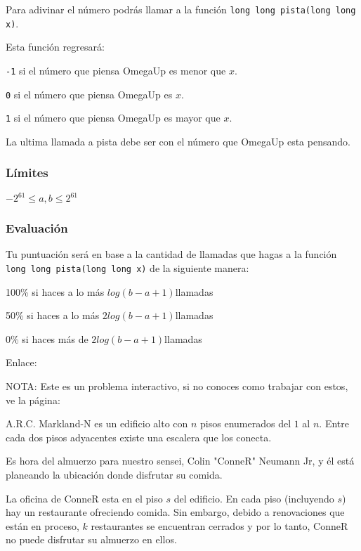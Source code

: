 Para adivinar el número podrás llamar a la función \verb|long long pista(long long x)|.

Esta función regresará:
\begin{plimits}
	\item \verb|-1| si el número que piensa OmegaUp es menor que \(x\).
	\item \verb|0| si el número que piensa OmegaUp es \(x\).
	\item \verb|1| si el número que piensa OmegaUp es mayor que \(x\).
\end{plimits} 

La ultima llamada a pista debe ser con el número que OmegaUp esta pensando.

\subsubsection*{Límites}
\begin{plimits}
	\item \(-2^{61}\leq a,b \leq 2^{61}\)	
\end{plimits}
\subsubsection*{Evaluación}
Tu puntuación será en base a la cantidad de llamadas que hagas a la función \verb|long long pista(long long x)| de la siguiente manera:
\begin{plimits}
	\item 100\% si haces a lo más \(log(b-a+1)\)llamadas
	\item 50\% si haces a lo más \(2log(b-a+1)\)llamadas
	\item 0\% si haces más de \(2log(b-a+1)\)llamadas
\end{plimits}

Enlace: 

NOTA: Este es un problema interactivo, si no conoces como trabajar con estos, ve la página: \pageref{interactivos}

\problembreak

\problemtitle A.R.C. Markland-N es un edificio alto con \(n\) pisos enumerados del \(1\) al \(n\). Entre cada dos pisos adyacentes existe una escalera que los conecta.

Es hora del almuerzo para nuestro sensei, Colin "ConneR" Neumann Jr, y él está planeando la ubicación donde disfrutar su comida.

La oficina de ConneR esta en el piso \(s\) del edificio. En cada piso (incluyendo \(s\)) hay un restaurante ofreciendo comida. Sin embargo, debido a renovaciones que están en proceso, \(k\) restaurantes se encuentran cerrados y por lo tanto, ConneR no puede disfrutar su almuerzo en ellos.

